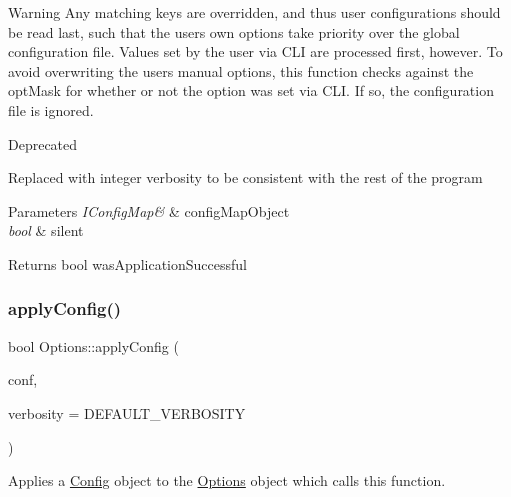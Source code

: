 \begin{DoxyWarning}{Warning}
Any matching keys are overridden, and thus user configurations should be read last, such that the user\textquotesingle{}s own options take priority over the global configuration file. Values set by the user via C\+LI are processed first, however. To avoid overwriting the user\textquotesingle{}s manual options, this function checks against the opt\+Mask for whether or not the option was set via C\+LI. If so, the configuration file is ignored.
\end{DoxyWarning}
\begin{DoxyRefDesc}{Deprecated}
\item[\mbox{\hyperlink{deprecated__deprecated000018}{Deprecated}}]Replaced with integer verbosity to be consistent with the rest of the program\end{DoxyRefDesc}



\begin{DoxyParams}{Parameters}
{\em I\+Config\+Map\&} & config\+Map\+Object \\
\hline
{\em bool} & silent\\
\hline
\end{DoxyParams}
\begin{DoxyReturn}{Returns}
bool was\+Application\+Successful 
\end{DoxyReturn}
\mbox{\label{classOptions_a4f55ba62327aba951afda6eed9207c71}} 
\subsubsection{\texorpdfstring{applyConfig()}{applyConfig()}\hspace{0.1cm}{\footnotesize\ttfamily [2/2]}}
{\footnotesize\ttfamily bool Options\+::apply\+Config (\begin{DoxyParamCaption}\item[{\mbox{\hyperlink{classIConfigMap}{I\+Config\+Map}} \&}]{conf,  }\item[{unsigned int}]{verbosity = {\ttfamily DEFAULT\+\_\+VERBOSITY} }\end{DoxyParamCaption})}



Applies a \mbox{\hyperlink{classConfig}{Config}} object to the \mbox{\hyperlink{classOptions}{Options}} object which calls this function. 

